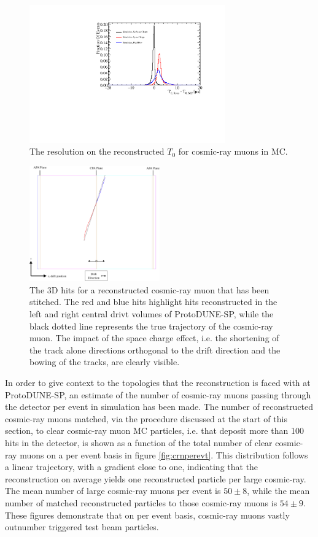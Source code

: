 \begin{figure}
\centering
\includegraphics[width=0.75\textwidth]{Figures/Metrics/MC/Cosmics/CosmicRayT0Resolustion.pdf}
\caption{The resolution on the reconstructed $T_{0}$ for cosmic-ray muons in MC.}
\label{fig:crt0res}
\end{figure}

\begin{figure}
\centering
\includegraphics[width=0.5\textwidth]{Figures/EventDisplays/MC/SpaceChargeEffect.pdf}
\caption{The 3D hits for a reconstructed cosmic-ray muon that has been stitched.  The red and blue hits highlight hits reconstructed in the left and right central drivt volumes of ProtoDUNE-SP, while the black dotted line represents the true trajectory of the cosmic-ray muon.  The impact of the space charge effect, i.e. the shortening of the track alone directions orthogonal to the drift direction and the bowing of the tracks, are clearly visible.}
\label{fig:spacechargetrack}
\end{figure}

In order to give context to the topologies that the reconstruction is faced with at ProtoDUNE-SP, an estimate of the number of cosmic-ray muons passing through the detector per event in simulation has been made.  The number of reconstructed cosmic-ray muons matched, via the procedure discussed at the start of this section, to clear cosmic-ray muon MC particles, i.e. that deposit more than 100 hits in the detector, is shown as a function of the total number of clear cosmic-ray muons on a per event basis in figure \ref{fig:crnperevt}.  This distribution follows a linear trajectory, with a gradient close to one, indicating that the reconstruction on average yields one reconstructed particle per large cosmic-ray.  The mean number of large cosmic-ray muons per event is $50\pm8$, while the mean number of matched reconstructed particles to those cosmic-ray muons is $54\pm9$.  These figures demonstrate that on per event basis, cosmic-ray muons vastly outnumber triggered test beam particles.

